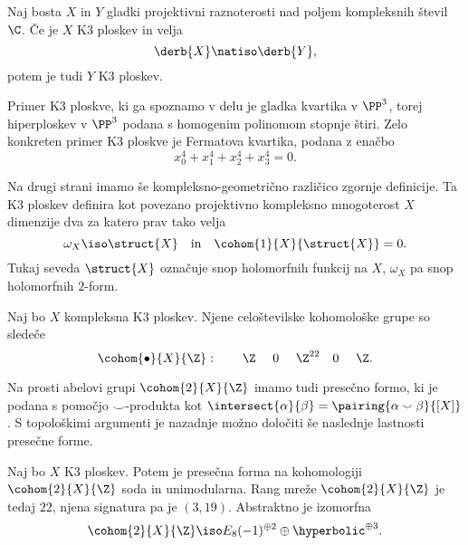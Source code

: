 \begin{izrek}
    Naj bosta $X$ in $Y$ gladki projektivni raznoterosti nad poljem kompleksnih števil $\C$. Če je $X$ K3 ploskev in velja
    \[
        \derb{X} \natiso \derb{Y},
    \]
    potem je tudi $Y$ K3 ploskev. 
\end{izrek}

Primer K3 ploskve, ki ga spoznamo v delu je gladka kvartika v $\PP^3$, torej hiperploskev v $\PP^3$ podana s homogenim polinomom stopnje štiri. Zelo konkreten primer K3 ploskve je Fermatova kvartika, podana z enačbo
\[
    x_0^4 + x_1^4 + x_2^4 + x_3^4 = 0.
\]




Na drugi strani imamo še kompleksno-geometrično različico zgornje definicije. Ta K3 ploskev definira kot povezano projektivno kompleksno mnogoterost $X$ dimenzije dva za katero prav tako velja
\[
    \omega_X \iso \struct{X} \quad \text{in} \quad \cohom{1}{X}{\struct{X}} = 0.
\]
Tukaj seveda $\struct{X}$ označuje snop holomorfnih funkcij na $X$, $\omega_X$ pa snop holomorfnih $2$-form.

\begin{trditev}
    Naj bo $X$ kompleksna K3 ploskev. Njene celoštevilske kohomološke grupe so sledeče
    \begin{equation}
        \cohom{\bullet}{X}{\Z}: \qquad \Z \ \quad 0\ \quad \Z^{22} \quad 0\ \quad \Z.
    \end{equation}
\end{trditev}

Na prosti abelovi grupi $\cohom{2}{X}{\Z}$ imamo tudi presečno formo, ki je podana s pomočjo $\smallsmile$-produkta kot $\intersect{\alpha}{\beta} = \pairing{\alpha \smallsmile \beta}{[X]}$. S topološkimi argumenti je nazadnje možno določiti še naslednje lastnosti presečne forme.

\begin{trditev}
    Naj bo $X$ K3 ploskev. Potem je presečna forma na kohomologiji $\cohom{2}{X}{\Z}$ soda in unimodularna. Rang mreže $\cohom{2}{X}{\Z}$ je tedaj $22$, njena signatura pa je $(3,19)$. Abstraktno je izomorfna
    \begin{equation}
        \cohom{2}{X}{\Z} \iso E_8(-1)^{\oplus 2} \oplus \hyperbolic^{\oplus 3}.
    \end{equation}
\end{trditev}

